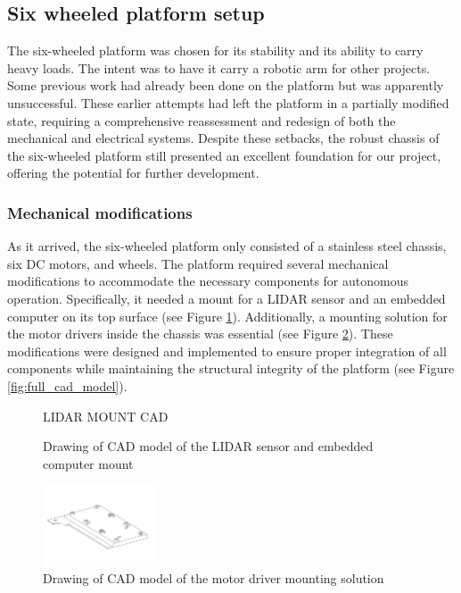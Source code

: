 \documentclass[11pt]{article}
\begin{document}
    \subsection{Six wheeled platform setup}

        The six-wheeled platform was chosen for its stability and its ability to carry heavy loads. The intent was to have it carry a robotic arm for other projects. Some previous work had already been done on the platform but was apparently unsuccessful. These earlier attempts had left the platform in a partially modified state, requiring a comprehensive reassessment and redesign of both the mechanical and electrical systems. Despite these setbacks, the robust chassis of the six-wheeled platform still presented an excellent foundation for our project, offering the potential for further development.

        \subsubsection{Mechanical modifications}
        As it arrived, the six-wheeled platform only consisted of a stainless steel chassis, six DC motors, and wheels. The platform required several mechanical modifications to accommodate the necessary components for autonomous operation. Specifically, it needed a mount for a LIDAR sensor and an embedded computer on its top surface (see Figure \ref{fig:LIDAR_mount}). Additionally, a mounting solution for the motor drivers inside the chassis was essential (see Figure \ref{fig:motor_driver_mount}). These modifications were designed and implemented to ensure proper integration of all components while maintaining the structural integrity of the platform (see Figure \ref{fig:full_cad_model}).

        \begin{figure}[htbp]
            \centering
            LIDAR MOUNT CAD
            \caption{Drawing of CAD model of the LIDAR sensor and embedded computer mount}
            \label{fig:LIDAR_mount}
        \end{figure}
        
        \begin{figure}[htbp]
            \centering
            \includegraphics[width=0.3\textwidth]{Images/Motor_driver_holder.pdf}
            \caption{Drawing of CAD model of the motor driver mounting solution}
            \label{fig:motor_driver_mount}
        \end{figure}
        
\end{document}
